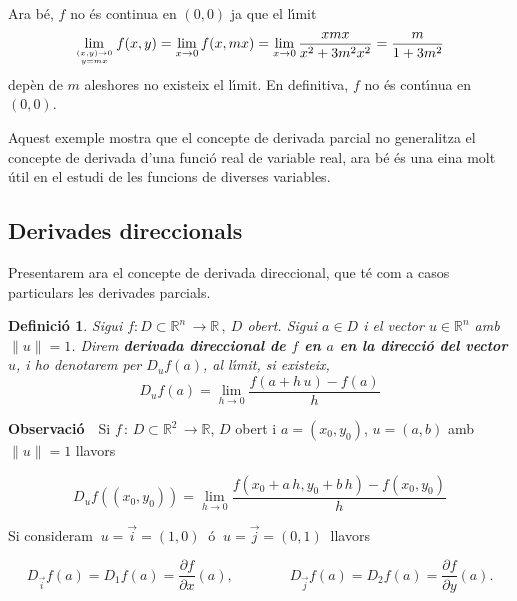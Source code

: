 \documentclass[12pt]{article}
\newcommand{\observacio}{\textbf{Observaci{\'o}}\ \ }
\newtheorem{definicio}{Definici{\'o}}[subsection]
\newcommand{\R}{\mathbb{R}}
\begin{document}
Ara b{\'e}, $f$ no {\'e}s continua en $(0,0)$ ja que el l{\'\i}mit
\vspace{0.4cm}\begin{equation*}
\lim_{(x,y)\to 0\atop y=mx} f(x,y)=\lim_{x\to 0}
f(x,mx)=\lim_{x\to 0}
\frac{xmx}{x^{2}+3m^{2}x^{2}}=\frac{m}{1+3m^{2}}
\end{equation*}
 dep{\`e}n de $m$ aleshores no existeix el l{\'\i}mit. En definitiva, $f$ no {\'e}s cont{\'\i}nua en $(0,0)$.


Aquest exemple mostra que el concepte de derivada
parcial no generalitza el concepte de derivada d'una
funci{\'o} real de variable real, ara b{\'e} {\'e}s una eina molt
{\'u}til en el estudi de les funcions de diverses variables.


\subsection{Derivades direccionals}

Presentarem ara el concepte de derivada direccional, que t{\'e} com a casos particulars les derivades parcials.

\vspace{0.4cm}
\begin{definicio}
Sigui $f: D\subset\R^n\, \longrightarrow\R\,,\ D$ obert. Sigui
$a\in D$ i el vector $u\in\R^n$ amb $\| u\| =1$.
Direm \textbf{derivada direccional de $f$ en $a$ en la direcci{\'o}
del vector $u$}, i ho denotarem per $D_u f(a)$, al
l{\'\i}mit, si existeix,
\[
D_u f(a) =\lim_{h\to 0}\frac{f(a+h\, u)-f(a)}{h}
\]
\end{definicio}

\observacio Si $f\, :\, D\subset\R^2\, \longrightarrow\R$, $D$ obert i $a=(x_0,y_0)$, $u=(a,b)$ amb $\| u\| =1$ llavors

\[
D_u f((x_0,y_0))=\lim_{h\to 0} \frac{f(x_0+a\,h,y_0+b\,h)-f(x_0,y_0)}{h}
\]

Si consideram $\ u=\overrightarrow{i}=(1,0)\ $ {\'o} $\ u=
\overrightarrow{j}=(0,1)\ $ llavors

\[
D_{\overrightarrow{i}}f(a)=D_1f(a)=\frac{\partial f}{\partial
x}(a),\qquad\qquad D_{\overrightarrow{j}}f(a)=D_2f(a)=\frac{\partial f}{\partial
y}(a).
\]
\end{document}
